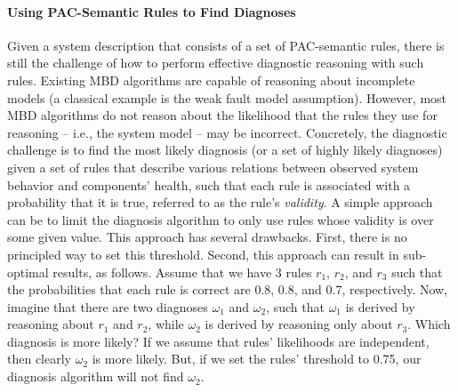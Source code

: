 \documentclass[12pt]{article}
\begin{document}
\paragraph{Using PAC-Semantic Rules to Find Diagnoses}
Given a system description that consists of a set of PAC-semantic rules, there is still the challenge 
of how to perform effective diagnostic reasoning with such rules. 
Existing MBD algorithms are capable of reasoning about incomplete models (a classical example is the weak fault model assumption). However, most MBD algorithms do not reason about the likelihood that the rules they use for reasoning -- i.e., the system model -- may be incorrect. 
Concretely, the diagnostic challenge is to find the most likely diagnosis (or a set of highly likely diagnoses) given a set of rules that describe various relations between observed system behavior and components' health, such that each rule is associated with a probability that it is true, referred to as the rule's {\em validity}. 
A simple approach can be to limit the diagnosis algorithm to only use rules whose validity is over some given value. This approach has several drawbacks. First, there is no principled way to set this threshold. Second, this approach can result in sub-optimal results, as follows. 
Assume that we have 3 rules $r_1$, $r_2$, and $r_3$ such that the probabilities that each rule is correct are 0.8, 0.8, and 0.7, respectively. 
Now, imagine that there are two diagnoses $\omega_1$ and $\omega_2$, such that $\omega_1$ is derived by reasoning about $r_1$ and $r_2$, while $\omega_2$ is derived by reasoning only about $r_3$. Which diagnosis is more likely? 
If we assume that rules' likelihoods are independent, then clearly $\omega_2$ is more likely. But, if we set the rules' threshold to 0.75, our diagnosis algorithm will not find $\omega_2$. 
\end{document}
